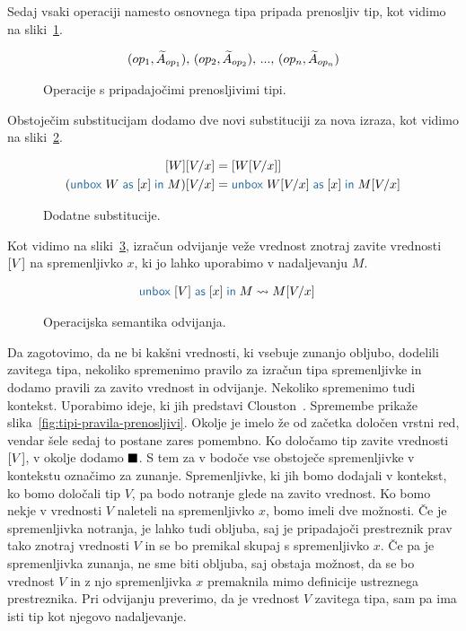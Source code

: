 Sedaj vsaki operaciji namesto osnovnega tipa pripada prenosljiv tip, kot vidimo na sliki~\ref{fig:prenosljive-operacije}.

\begin{figure}[H]
	\centering
	\small
	\begin{align*}
	(op_1, \widetilde{A}_{op_1}),\, (op_2, \widetilde{A}_{op_2}),\, ... ,\, (op_n, \widetilde{A}_{op_n})
	\end{align*}
	\vspace{-5ex}
	\caption{Operacije s pripadajočimi prenosljivimi tipi.}
	\label{fig:prenosljive-operacije}
\end{figure}

Obstoječim substitucijam dodamo dve novi substituciji za nova izraza, kot vidimo na sliki~\ref{fig:substitucija-box}.

\begin{figure}[H]
	\centering
	\small
	\begin{align*}
		\tmboxed{W}[V/x] &= \tmboxed{W[V/x]} \\
		(\tmunbox{W}{x}{M})[V/x] &= \tmunbox{W[V/x]}{x}{M[V/x]}
	\end{align*}
	\vspace{-5ex}
	\caption{Dodatne substitucije.}
	\label{fig:substitucija-box}
\end{figure}

Kot vidimo na sliki~\ref{fig:semantika-odvijanje}, izračun odvijanje veže vrednost znotraj zavite vrednosti $[V]$ na spremenljivko $x$, ki jo lahko uporabimo v nadaljevanju $M$.

\begin{figure}[h]
	\centering
	\small
	\begin{align*}
	\tmunbox{[V]}{x}{M} &\reduces M[V/x]
	\end{align*}
	
	\caption{Operacijska semantika odvijanja.}
	\label{fig:semantika-odvijanje}
\end{figure}


Da zagotovimo, da ne bi kakšni vrednosti, ki vsebuje zunanjo obljubo, dodelili zavitega tipa, nekoliko spremenimo pravilo za izračun tipa spremenljivke in dodamo pravili za zavito vrednost in odvijanje. Nekoliko spremenimo tudi kontekst. Uporabimo ideje, ki jih predstavi Clouston~\cite{fitch}. Spremembe prikaže slika~\ref{fig:tipi-pravila-prenosljivi}.
Okolje je imelo že od začetka določen vrstni red, vendar šele sedaj to postane zares pomembno. 
Ko določamo tip zavite vrednosti $[V]$, v okolje dodamo $\blacksquare$. S tem za v bodoče vse obstoječe spremenljivke v kontekstu označimo za zunanje. Spremenljivke, ki jih bomo dodajali v kontekst, ko bomo določali tip $V$, pa bodo notranje glede na zavito vrednost. Ko bomo nekje v vrednosti $V$ naleteli na spremenljivko $x$, bomo imeli dve možnosti. Če je spremenljivka notranja, je lahko tudi obljuba, saj je pripadajoči prestreznik prav tako znotraj vrednosti $V$ in se bo premikal skupaj s spremenljivko $x$. Če pa je spremenljivka zunanja, ne sme biti obljuba, saj obstaja možnost, da se bo vrednost $V$ in z njo spremenljivka $x$ premaknila mimo definicije ustreznega prestreznika.
Pri odvijanju preverimo, da je vrednost $V$ zavitega tipa, sam pa ima isti tip kot njegovo nadaljevanje.

